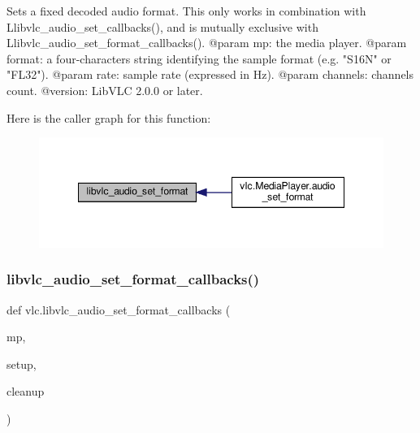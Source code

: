 \begin{DoxyVerb}Sets a fixed decoded audio format.
This only works in combination with L{libvlc_audio_set_callbacks}(),
and is mutually exclusive with L{libvlc_audio_set_format_callbacks}().
@param mp: the media player.
@param format: a four-characters string identifying the sample format (e.g. "S16N" or "FL32").
@param rate: sample rate (expressed in Hz).
@param channels: channels count.
@version: LibVLC 2.0.0 or later.
\end{DoxyVerb}
 Here is the caller graph for this function\+:
\nopagebreak
\begin{figure}[H]
\begin{center}
\leavevmode
\includegraphics[width=348pt]{namespacevlc_ab91a179094998e8bf3c5be9ab109e206_icgraph}
\end{center}
\end{figure}
\mbox{\label{namespacevlc_a0191b731e6860891d7788976a24c73b9}} 
\subsubsection{\texorpdfstring{libvlc\+\_\+audio\+\_\+set\+\_\+format\+\_\+callbacks()}{libvlc\_audio\_set\_format\_callbacks()}}
{\footnotesize\ttfamily def vlc.\+libvlc\+\_\+audio\+\_\+set\+\_\+format\+\_\+callbacks (\begin{DoxyParamCaption}\item[{}]{mp,  }\item[{}]{setup,  }\item[{}]{cleanup }\end{DoxyParamCaption})}

